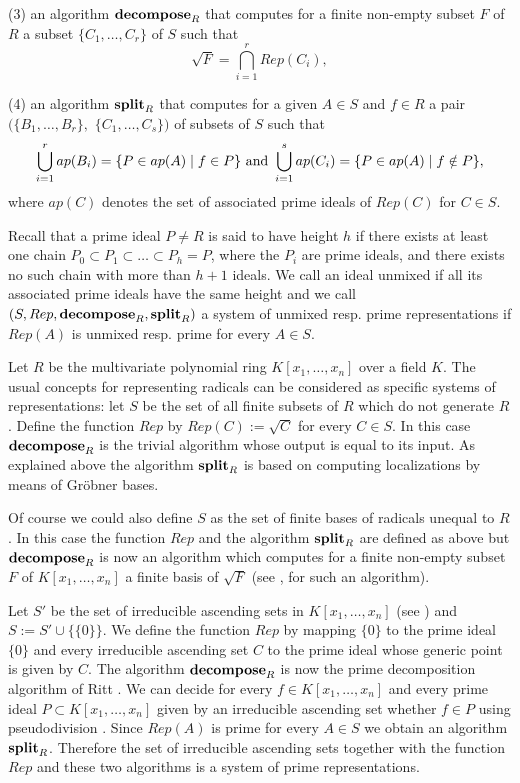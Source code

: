 \noindent
(3) an algorithm ${\bf decompose}_R$
that computes for a finite non-empty subset $F$ of $R$ a subset
$\{C_1,\ldots,C_r\}$ of $S$ such that
\[ \sqrt{F}=
\bigcap_{i=1}^r Rep(C_i), \]

\noindent
(4) an algorithm ${\bf split}_R$
that computes for a given $A\in S$ and $f\in R$ 
a pair $(\{B_1,\ldots,B_r\},$ 
$\{C_1,\ldots,C_s\})$ of subsets of $S$ such that
\[
\bigcup_{i=1}^r ap(B_i)=
\{P\in ap(A)\mid f\in P\} \hbox{ and }
\bigcup_{i=1}^s ap(C_i)=
\{P\in ap(A)\mid f\notin P\},
\]
where $ap(C)$ denotes the set of associated prime ideals of $Rep(C)$
for $C\in S$.

\smallskip
Recall that a prime ideal $P\not= R$ is said to have 
height $h$ if there exists at least one chain 
$P_0\subset P_1\subset\ldots\subset
P_h=P$, where the $P_i$ are prime ideals, and there exists no such chain with
more than $h+1$ ideals. We call an ideal unmixed if all its associated
prime ideals have the same height and we 
call $(S,Rep,{\bf decompose}_R,{\bf split}_R)$ a system of 
unmixed resp. prime representations
if $Rep(A)$
is unmixed resp. prime for every $A\in S$.


\medskip
\begin{example}{\rm 
Let $R$ be the multivariate polynomial ring 
$K[x_1,\ldots,x_n]$ over a field $K$. The usual concepts for representing
radicals can be considered as specific systems of representations:
let $S$ be the set of all finite subsets of $R$ which do not generate
$R$. Define
the function $Rep$ 
by $Rep(C):=\sqrt{C}$ for every $C\in S$.
In this case ${\bf decompose}_R$ is the trivial algorithm whose
output is equal to its input. As explained above
the algorithm ${\bf split}_R$ is based on computing localizations by
means of Gr\"obner bases.

Of course we could also define $S$ as the set of finite bases of radicals
unequal to $R$.
In this case the function $Rep$ and the algorithm ${\bf split}_R$ are
defined as above but ${\bf decompose}_R$ is now an algorithm which computes 
for a finite non-empty subset $F$ of $K[x_1,\ldots,x_n]$ a finite basis
of $\sqrt{F}$ (see \cite{GTZ88}, for such an algorithm).

Let $S'$ be the
set of irreducible ascending sets in $K[x_1,\ldots,x_n]$
(see \cite{Wu84}) and $S:=S'\cup\{\{0\}\}$. We define the 
function $Rep$ by mapping $\{0\}$ to the prime ideal $\{0\}$
and every irreducible ascending set $C$ to the prime ideal whose
generic point is given
by $C$. The algorithm ${\bf decompose}_R$ is now the prime decomposition
algorithm of Ritt \cite{Ritt50}. We can decide 
for every $f\in K[x_1,\ldots,x_n]$ and every prime ideal
$P\subset K[x_1,\ldots,x_n]$ given by an irreducible ascending set
whether $f\in P$ using pseudodivision \cite{Wu84}. Since $Rep(A)$ is
prime for
every $A\in S$ we obtain an algorithm ${\bf split}_R$. Therefore
the set of irreducible ascending sets together with the function $Rep$
and these two algorithms is a system of prime representations.
}
\end{example}


